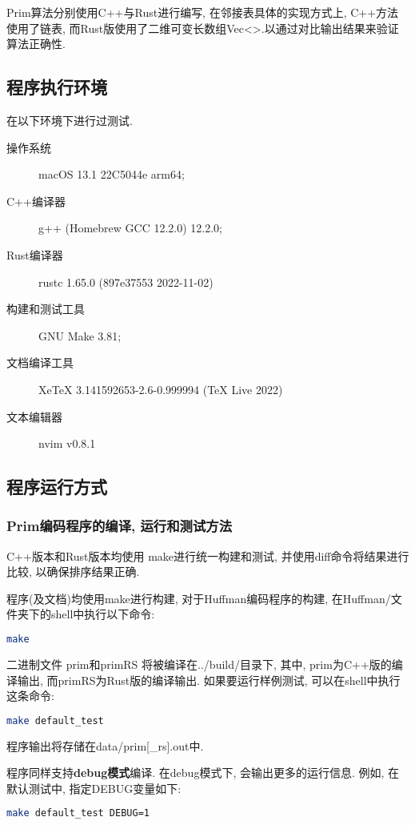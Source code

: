 Prim算法分别使用C++与Rust进行编写, 在邻接表具体的实现方式上,
C++方法使用了链表,
而Rust版使用了二维可变长数组Vec<>.以通过对比输出结果来验证算法正确性.

\subsection{程序执行环境}
在以下环境下进行过测试.

\begin{description}
	\item[操作系统] macOS 13.1 22C5044e arm64;
	\item[C++编译器] g++ (Homebrew GCC 12.2.0) 12.2.0;
	\item[Rust编译器] rustc 1.65.0 (897e37553 2022-11-02)
	\item[构建和测试工具] GNU Make 3.81;
	\item[文档编译工具] XeTeX 3.141592653-2.6-0.999994 (TeX Live 2022)
	\item[文本编辑器] nvim v0.8.1
\end{description}

\subsection{程序运行方式}
\subsubsection{Prim编码程序的编译, 运行和测试方法}
C++版本和Rust版本均使用 make进行统一构建和测试, 并使用diff命令将结果进行比较,
以确保排序结果正确.\par

程序(及文档)均使用make进行构建, 对于Huffman编码程序的构建, 在Huffman/文件夹下的shell中执行以下命令:
\begin{lstlisting}[language=bash]
make
\end{lstlisting}
二进制文件 prim和primRS 将被编译在../build/目录下, 其中,
prim为C++版的编译输出, 而primRS为Rust版的编译输出.
如果要运行样例测试, 可以在shell中执行这条命令:

\begin{lstlisting}[language=bash]
make default_test
\end{lstlisting}
程序输出将存储在data/prim[\_rs].out中.\par

程序同样支持\textbf{debug模式}编译. 在debug模式下, 会输出更多的运行信息.
例如, 在默认测试中, 指定DEBUG变量如下:
\begin{lstlisting}[language=bash]
make default_test DEBUG=1
\end{lstlisting}


